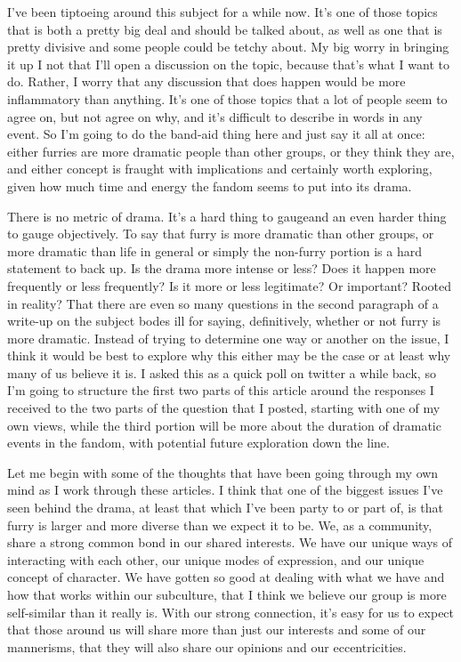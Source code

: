 I've been tiptoeing around this subject for a while now. It's one of those topics that is both a pretty big deal and should be talked about, as well as one that is pretty divisive and some people could be tetchy about. My big worry in bringing it up I not that I'll open a discussion on the topic, because that's what I want to do. Rather, I worry that any discussion that does happen would be more inflammatory than anything. It's one of those topics that a lot of people seem to agree on, but not agree on why, and it's difficult to describe in words in any event. So I'm going to do the band-aid thing here and just say it all at once: either furries are more dramatic people than other groups, or they think they are, and either concept is fraught with implications and certainly worth exploring, given how much time and energy the fandom seems to put into its drama.

There is no metric of drama. It's a hard thing to gaugeand an even harder thing to gauge objectively. To say that furry is more dramatic than other groups, or more dramatic than life in general or simply the non-furry portion is a hard statement to back up. Is the drama more intense or less? Does it happen more frequently or less frequently? Is it more or less legitimate? Or important? Rooted in reality? That there are even so many questions in the second paragraph of a write-up on the subject bodes ill for saying, definitively, whether or not furry is more dramatic. Instead of trying to determine one way or another on the issue, I think it would be best to explore why this either may be the case or at least why many of us believe it is. I asked this as a quick poll on twitter a while back, so I'm going to structure the first two parts of this article around the responses I received to the two parts of the question that I posted, starting with one of my own views, while the third portion will be more about the duration of dramatic events in the fandom, with potential future exploration down the line.

Let me begin with some of the thoughts that have been going through my own mind as I work through these articles. I think that one of the biggest issues I've seen behind the drama, at least that which I've been party to or part of, is that furry is larger and more diverse than we expect it to be. We, as a community, share a strong common bond in our shared interests. We have our unique ways of interacting with each other, our unique modes of expression, and our unique concept of character. We have gotten so good at dealing with what we have and how that works within our subculture, that I think we believe our group is more self-similar than it really is. With our strong connection, it's easy for us to expect that those around us will share more than just our interests and some of our mannerisms, that they will also share our opinions and our eccentricities.

